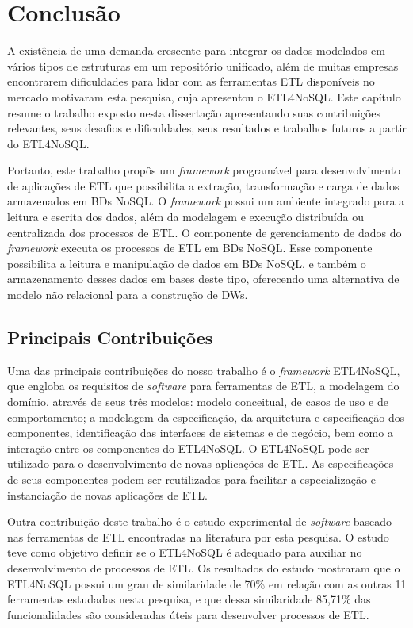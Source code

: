 \chapter{Conclusão}


A existência de uma demanda crescente para integrar os dados modelados em vários tipos de estruturas em um repositório unificado, além de muitas empresas encontrarem dificuldades para lidar com as ferramentas ETL disponíveis no mercado motivaram esta pesquisa, cuja apresentou o ETL4NoSQL. Este capítulo resume o trabalho exposto nesta dissertação apresentando suas contribuições relevantes, seus desafios e dificuldades, seus resultados e trabalhos futuros a partir do ETL4NoSQL. 


Portanto, este trabalho propôs um \textit{framework} programável para desenvolvimento de aplicações de ETL que possibilita a extração, transformação e carga de dados armazenados em BDs NoSQL. O \textit{framework} possui um ambiente integrado para a leitura e escrita dos dados, além da modelagem e execução distribuída ou centralizada dos processos de ETL. O componente de gerenciamento de dados do \textit{framework} executa os processos de ETL em BDs NoSQL. Esse componente possibilita a leitura e manipulação de dados em BDs NoSQL, e também o armazenamento desses dados em bases deste tipo, oferecendo uma alternativa de modelo não relacional para a construção de DWs.

\clearpage

\section{Principais Contribuições}

Uma das principais contribuições do nosso trabalho é o \textit{framework} ETL4NoSQL, que engloba os requisitos de \textit{software} para ferramentas de ETL, a modelagem do domínio, através de seus três modelos: modelo conceitual, de casos de uso e de comportamento; a modelagem da especificação, da arquitetura e especificação dos componentes, identificação das interfaces de sistemas e de negócio, bem como a interação entre os componentes do ETL4NoSQL. O ETL4NoSQL pode ser utilizado para o desenvolvimento de novas aplicações de ETL. As especificações de seus componentes podem ser reutilizados para facilitar a especialização e instanciação de novas aplicações de ETL.

Outra contribuição deste trabalho é o estudo experimental de \textit{software} baseado nas ferramentas de ETL encontradas na literatura por esta pesquisa. O estudo teve como objetivo definir se o ETL4NoSQL é adequado para auxiliar no desenvolvimento de processos de ETL. Os resultados do estudo mostraram que o ETL4NoSQL possui um grau de similaridade de 70\% em relação com as outras 11 ferramentas estudadas nesta pesquisa, e que dessa similaridade 85,71\% das funcionalidades são consideradas úteis para desenvolver processos de ETL.

